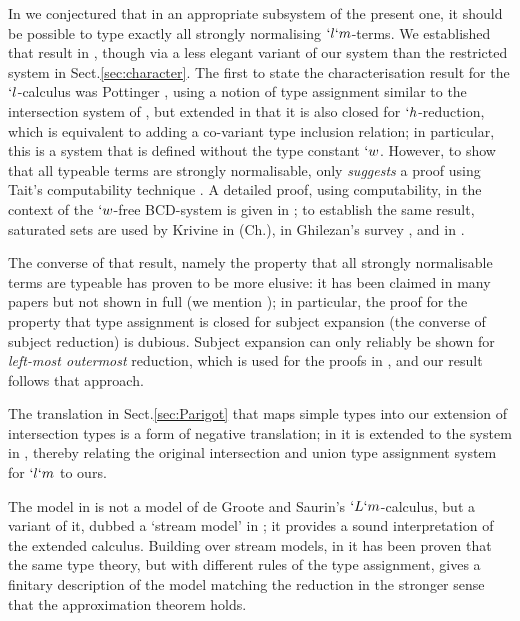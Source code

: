 \documentclass{lmcs}
\begin{document}
In \cite{Bakel-Barbanera-deLiguoro-TLCA'11} we conjectured that in an appropriate subsystem of the present one, it should be possible to type exactly all strongly normalising $`l`m$-terms.
We established that result in \cite{BakBdL-ITRS12}, though via a less elegant variant of our system than the restricted system in Sect.\skp\ref{sec:character}.
The first to state the characterisation result for the $`l$-calculus was Pottinger \cite{Pottinger'80}, using a notion of type assignment similar to the intersection system of \cite{Coppo-Dezani'78,Coppo-Dezani-Venneri'80}, but extended in that it is also closed for $`h$-reduction, which is equivalent to adding a co-variant type inclusion relation; in particular, this is a system that is defined without the type constant $`w$.
However, to show that all typeable terms are strongly normalisable, \cite{Pottinger'80} only \emph{suggests} a proof using Tait's computability technique \cite{Tait'67}.
A detailed proof, using computability, in the context of the $`w$-free BCD-system \cite{BCD'83} is given in \cite{Bakel-TCS'92}; to establish the same result, saturated sets are used by Krivine in \cite{Krivine-book'93} (Ch.), in Ghilezan's survey \cite{Ghilezan'96}, and in \cite{Bakel-ACM'11}.

The converse of that result, namely the property that all strongly normalisable terms are typeable has proven to be more elusive: it has been claimed in many papers but not shown in full (we mention \cite{Pottinger'80,Bakel-TCS'92,Ghilezan'96}); in particular, the proof for the property that type assignment is closed for subject expansion (the converse of subject reduction) is dubious.
Subject expansion can only reliably be shown for \emph{left-most outermost} reduction, which is used for the proofs in \cite{Krivine-book'93,Bakel-Dezani-LATIN'02,Bakel-NDJFL'04,Bakel-ACM'11}, and our result follows that approach.

The translation in Sect.\skp\ref{sec:Parigot} that maps simple types into our extension of intersection types is a form of negative translation; in \cite{KikSak14} it is extended to the system in \cite{Bakel-ITRS'10}, thereby relating the original intersection and union type assignment system for $`l`m$ to ours.

The model in \cite{Streicher-Reus'98} is not a model of de Groote and Saurin's $`L`m$-calculus, but a variant of it, dubbed a `stream model' in \cite{NakazawaK-CLC12}; it provides a sound interpretation of the extended calculus. 
Building over stream models, in \cite{deLiguoro:ApproxLM12} it has been proven that the same type theory, but with different rules of the type assignment, gives a finitary description of the model matching the reduction in the stronger sense that the approximation theorem holds.
\end{document}
